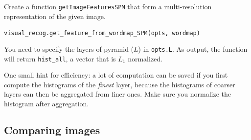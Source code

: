 \documentclass[10pt]{article}
\makeatletter
\DeclareRobustCommand\onedot{\futurelet\@let@token\@onedot}
\def\@onedot{\ifx\@let@token.\else.\null\fi\xspace}
\def\ie{\emph{i.e}\onedot} \def\Ie{\emph{I.e}\onedot}
\makeatother
\begin{document}
\par {}
Create a function {\tt getImageFeaturesSPM} that form a multi-resolution representation of the given image.

\begin{center}
{\tt visual\_recog.get\_feature\_from\_wordmap\_SPM(opts, wordmap)}
\end{center}
You need to specify the layers of pyramid ($L$) in {\tt opts.L}. 
As output, the function will return {\tt hist\_all}, a vector that is $L_1$ normalized. 

One small hint for efficiency: a lot of computation can be saved if you first compute the histograms of the {\it finest} layer, because the histograms of coarser layers can then be aggregated from finer ones. Make sure you normalize the histogram after aggregation.

\subsection{Comparing images}
\end{document}
